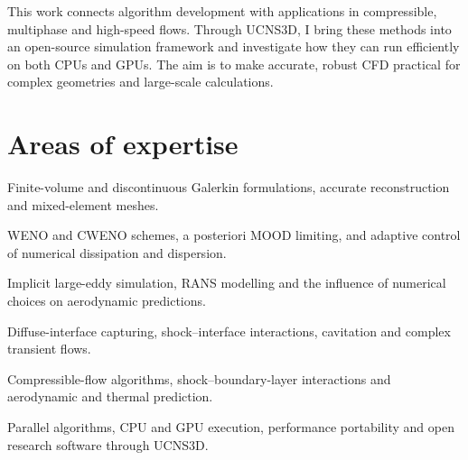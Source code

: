 \documentclass[11pt,a4paper]{article}
\newcommand{\cvsection}[1]{%
  \par\Needspace{10\baselineskip}\section*{#1}\markboth{#1}{}}
\begin{document}
This work connects algorithm development with applications in compressible, multiphase and high-speed flows. Through UCNS3D, I bring these methods into an open-source simulation framework and investigate how they can run efficiently on both CPUs and GPUs. The aim is to make accurate, robust CFD practical for complex geometries and large-scale calculations.



\cvsection{Areas of expertise}

\par{} Finite-volume and discontinuous Galerkin formulations, accurate reconstruction and mixed-element meshes.\par\vspace{3pt}

\par{} WENO and CWENO schemes, a posteriori MOOD limiting, and adaptive control of numerical dissipation and dispersion.\par\vspace{3pt}

\par{} Implicit large-eddy simulation, RANS modelling and the influence of numerical choices on aerodynamic predictions.\par\vspace{3pt}

\par{} Diffuse-interface capturing, shock--interface interactions, cavitation and complex transient flows.\par\vspace{3pt}

\par{} Compressible-flow algorithms, shock--boundary-layer interactions and aerodynamic and thermal prediction.\par\vspace{3pt}

\par{} Parallel algorithms, CPU and GPU execution, performance portability and open research software through UCNS3D.\par\vspace{3pt}
\end{document}
